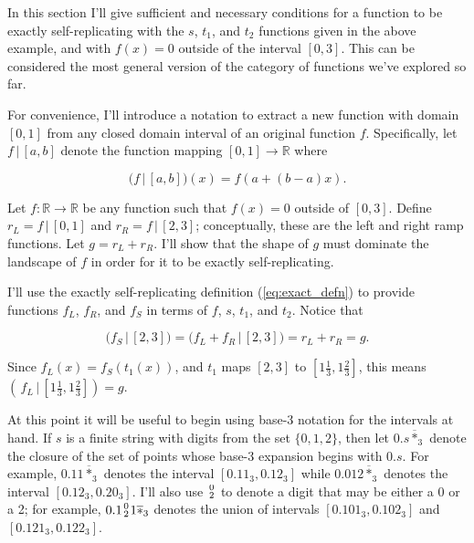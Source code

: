 \documentclass[]{article}
\begin{document}
In this section I'll give sufficient and necessary conditions for a
function to be exactly self-replicating with the \(s\), \(t_1\), and
\(t_2\) functions given in the above example, and with \(f(x)=0\)
outside of the interval \([0, 3]\). This can be considered the most
general version of the category of functions we've explored so far.

\newcommand{\restrict}{\,\big|\,}

For convenience, I'll introduce a notation to extract a new function
with domain \([0, 1]\) from any closed domain interval of an original
function \(f\). Specifically, let \(f \restrict [a, b]\) denote the
function mapping \([0,1]\to\mathbb{R}\) where

\[
\big(f \restrict [a,b]\big)(x) = f(a + (b-a)x).
\]

Let \(f:\mathbb{R}\to\mathbb{R}\) be any function such that \(f(x)=0\)
outside of \([0, 3]\). Define \(r_L = f\restrict [0, 1]\) and
\(r_R = f\restrict [2,3]\); conceptually, these are the left and right
ramp functions. Let \(g = r_L + r_R\). I'll show that the shape of \(g\)
must dominate the landscape of \(f\) in order for it to be exactly
self-replicating.

I'll use the exactly self-replicating definition (\ref{eq:exact_defn})
to provide functions \(f_L\), \(f_R\), and \(f_S\) in terms of \(f\),
\(s\), \(t_1\), and \(t_2\). Notice that

\[\big(f_S \restrict [2,3]\big) = \big(f_L + f_R \restrict [2, 3]\big) =
r_L + r_R = g.\]

Since \(f_L(x) = f_S(t_1(x))\), and \(t_1\) maps \([2,3]\) to
\([1\tfrac{1}{3}, 1\tfrac{2}{3}]\), this means
\((\,f_L \restrict [1\tfrac{1}{3}, 1\tfrac{2}{3}]) = g\).

\newcommand{\zerotwo}{\raise1.5pt\hbox{$\genfrac{}{}{0pt}{}
{\lower1.8pt\hbox{$\smash{\scriptstyle 0}$}}
{\raise0pt\hbox{$\smash{\scriptstyle 2}$}}$}}


At this point it will be useful to begin using base-3 notation for the
intervals at hand. If \(s\) is a finite string with digits from the set
\(\{0, 1, 2\}\), then let \(0.s\overline{*}_3\) denote the closure of
the set of points whose base-3 expansion begins with \(0.s\). For
example, \(0.11\overline{*}_3\) denotes the interval
\([0.11_3, 0.12_3]\) while \(0.012\overline{*}_3\) denotes the interval
\([0.12_3, 0.20_3]\). I'll also use \(\zerotwo\) to denote a digit that
may be either a 0 or a 2; for example, \(0.1\zerotwo 1\overline{*}_3\)
denotes the union of intervals \([0.101_3, 0.102_3]\) and
\([0.121_3, 0.122_3]\).
\end{document}

